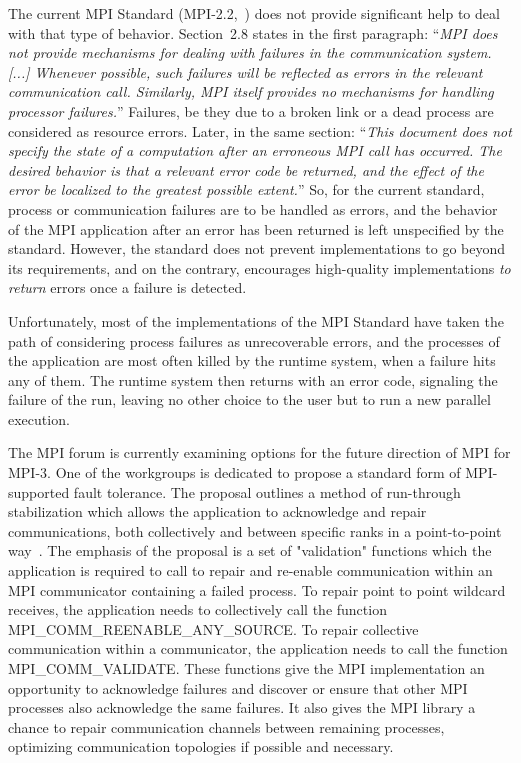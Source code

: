 The current MPI Standard (MPI-2.2,~\cite{MPI22}) does not provide
significant help to deal with that type of behavior. Section~2.8
states in the first paragraph: ``\emph{MPI does not provide mechanisms
  for dealing with failures in the communication system. [...]
  Whenever possible, such failures will be reflected as errors in the
  relevant communication call. Similarly, MPI itself provides no
  mechanisms for handling processor failures.}'' Failures, be they due
to a broken link or a dead process are considered as resource
errors. Later, in the same section: ``\emph{This document does not
  specify the state of a computation after an erroneous MPI call has
  occurred. The desired behavior is that a relevant error code be
  returned, and the effect of the error be localized to the greatest
  possible extent.}'' So, for the current standard, process or
communication failures are to be handled as errors, and the behavior
of the MPI application after an error has been returned is left
unspecified by the standard. However, the standard does not prevent
implementations to go beyond its requirements, and on the contrary,
encourages high-quality implementations \emph{to return} errors once a
failure is detected.

Unfortunately, most of the implementations of the MPI Standard have
taken the path of considering process failures as unrecoverable
errors, and the processes of the application are most often killed by
the runtime system, when a failure hits any of them. The runtime
system then returns with an error code, signaling the failure of the
run, leaving no other choice to the user but to run a new parallel
execution.

The MPI forum is currently examining options for the future direction
of MPI for MPI-3. One of the workgroups is dedicated to propose a
standard form of MPI-supported fault tolerance. The proposal outlines
a method of run-through stabilization which allows the application to
acknowledge and repair communications, both collectively and between
specific ranks in a point-to-point way~\cite{Hursey11MPI3FT}. The
emphasis of the proposal is a set of "validation" functions which the
application is required to call to repair and re-enable communication within
an MPI communicator containing a failed process. To repair point to
point wildcard receives, the application needs to collectively call the function
MPI\_COMM\_REENABLE\_ANY\_SOURCE. To repair collective communication
within a communicator, the application needs to call the function
MPI\_COMM\_VALIDATE.  These functions give the MPI implementation an
opportunity to acknowledge failures and discover or ensure that other
MPI processes also acknowledge the same failures. It also gives the
MPI library a chance to repair communication channels between
remaining processes, optimizing communication topologies if possible
and necessary.

